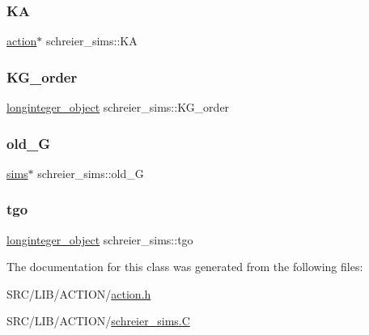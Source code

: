 \subsubsection{\texorpdfstring{KA}{KA}}
{\footnotesize\ttfamily \mbox{\hyperlink{classaction}{action}}$\ast$ schreier\+\_\+sims\+::\+KA}

\mbox{\label{classschreier__sims_ae27bf6d98b01f4990ce54ec124ea06d2}} 
\subsubsection{\texorpdfstring{K\+G\+\_\+order}{KG\_order}}
{\footnotesize\ttfamily \mbox{\hyperlink{classlonginteger__object}{longinteger\+\_\+object}} schreier\+\_\+sims\+::\+K\+G\+\_\+order}

\mbox{\label{classschreier__sims_ad7bd24f58d0a1360bc0250cdad2cddf2}} 
\subsubsection{\texorpdfstring{old\+\_\+G}{old\_G}}
{\footnotesize\ttfamily \mbox{\hyperlink{classsims}{sims}}$\ast$ schreier\+\_\+sims\+::old\+\_\+G}

\mbox{\label{classschreier__sims_ab817cde1a270fbb3fef176d433b4b090}} 
\subsubsection{\texorpdfstring{tgo}{tgo}}
{\footnotesize\ttfamily \mbox{\hyperlink{classlonginteger__object}{longinteger\+\_\+object}} schreier\+\_\+sims\+::tgo}



The documentation for this class was generated from the following files\+:\begin{DoxyCompactItemize}
\item 
S\+R\+C/\+L\+I\+B/\+A\+C\+T\+I\+O\+N/\mbox{\hyperlink{action_8h}{action.\+h}}\item 
S\+R\+C/\+L\+I\+B/\+A\+C\+T\+I\+O\+N/\mbox{\hyperlink{schreier__sims_8_c}{schreier\+\_\+sims.\+C}}\end{DoxyCompactItemize}
